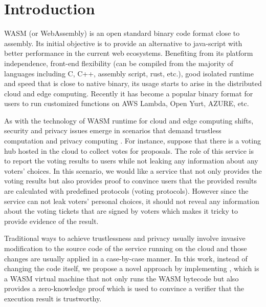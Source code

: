 \section{Introduction}
WASM (or WebAssembly) is an open standard binary code format close to assembly. Its initial objective is to provide an alternative to java-script with better performance in the current web ecosystems. Benefiting from its platform independence, front-end flexibility (can be compiled from the majority of languages including C, C++, assembly script, rust, etc.), good isolated runtime and speed that is close to native binary, its usage starts to arise in the distributed cloud and edge computing. Recently it has become a popular binary format for users to run customized functions on AWS Lambda, Open Yurt, AZURE, etc.

As with the technology of WASM runtime for cloud and edge computing shifts, security and privacy \cite{pearson2009taking, gadepalli2020sledge-wasmsec} issues emerge in scenarios that demand trustless \cite{wood2016trustless, chang2002trustless, mcfadden2018security} computation and privacy computing \cite{xiao2012security,takabi2010security}. For instance, suppose that there is a voting hub hosted in the cloud to collect votes for proposals. The role of this service is to report the voting results to users while not leaking any information about any voters' choices. In this scenario, we would like a service that not only provides the voting results but also provides proof to convince users that the provided results are calculated with predefined protocols (voting protocols). However since the service can not leak voters' personal choices, it should not reveal any information about the voting tickets that are signed by voters which makes it tricky to provide evidence of the result. 

Traditional ways to achieve trustlessness and privacy usually involve invasive modification \cite{jin2012proof-tl,chong2013enforcing-tl, crary2003foundational-tl, azzedin2002evolving-tl} to the source code of the service running on the cloud and those changes are usually applied in a case-by-case manner. In this work, instead of changing the code itself, we propose a novel approach by implementing \zkwasm, which is a WASM virtual machine that not only runs the WASM bytecode but also provides a zero-knowledge proof which is used to convince a verifier that the execution result is trustworthy.

